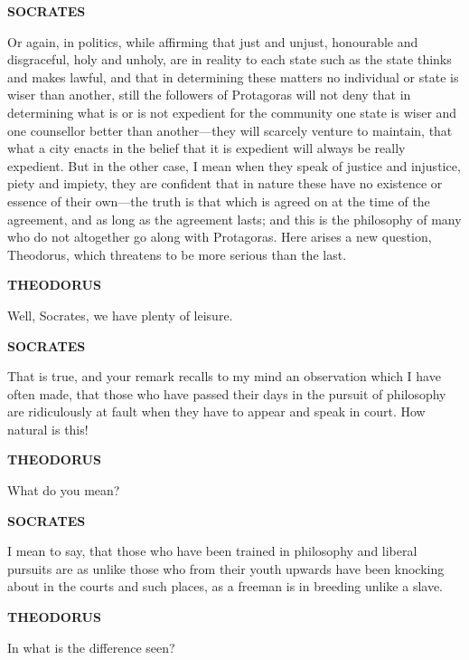 \documentclass[11pt,letter]{article}
\begin{document}
\par \textbf{SOCRATES}
\par   Or again, in politics, while affirming that just and unjust, honourable and disgraceful, holy and unholy, are in reality to each state such as the state thinks and makes lawful, and that in determining these matters no individual or state is wiser than another, still the followers of Protagoras will not deny that in determining what is or is not expedient for the community one state is wiser and one counsellor better than another—they will scarcely venture to maintain, that what a city enacts in the belief that it is expedient will always be really expedient. But in the other case, I mean when they speak of justice and injustice, piety and impiety, they are confident that in nature these have no existence or essence of their own—the truth is that which is agreed on at the time of the agreement, and as long as the agreement lasts; and this is the philosophy of many who do not altogether go along with Protagoras. Here arises a new question, Theodorus, which threatens to be more serious than the last.

\par \textbf{THEODORUS}
\par   Well, Socrates, we have plenty of leisure.

\par \textbf{SOCRATES}
\par   That is true, and your remark recalls to my mind an observation which I have often made, that those who have passed their days in the pursuit of philosophy are ridiculously at fault when they have to appear and speak in court. How natural is this!

\par \textbf{THEODORUS}
\par   What do you mean?

\par \textbf{SOCRATES}
\par   I mean to say, that those who have been trained in philosophy and liberal pursuits are as unlike those who from their youth upwards have been knocking about in the courts and such places, as a freeman is in breeding unlike a slave.

\par \textbf{THEODORUS}
\par   In what is the difference seen?
\end{document}

